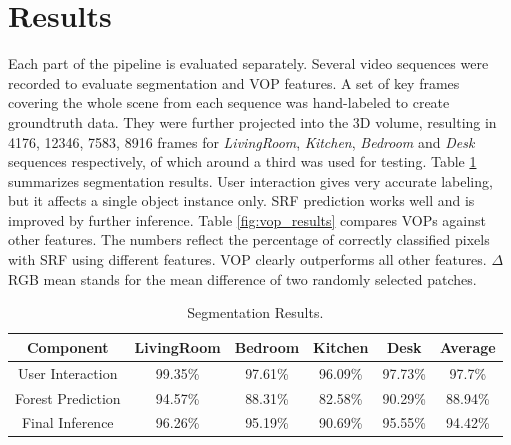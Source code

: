 \documentclass{llncs}
\begin{document}
% 

\section{Results}
  Each part of the pipeline is evaluated separately. Several video sequences were recorded to evaluate segmentation and VOP features. A set of key frames covering the whole scene from each sequence was hand-labeled to create groundtruth data. They were further projected into the 3D volume, resulting in 4176, 12346, 7583, 8916 frames for \emph{LivingRoom}, \emph{Kitchen}, \emph{Bedroom} and \emph{Desk} sequences respectively, of which around a third was used for testing. Table \ref{fig:segm_results} summarizes segmentation results. User interaction gives very accurate labeling, but it affects a single object instance only. SRF prediction works well and is improved by further inference. Table \ref{fig:vop_results} compares VOPs against other features. The numbers reflect the percentage of correctly classified pixels with SRF using different features. VOP clearly outperforms all other features. $\Delta$ RGB mean stands for the mean difference of two randomly selected patches. 
  
  
\begin{table}[!ht]	
 \center
 \caption{Segmentation Results.}
 \begin{tabular}{c|c|c|c|c|c}
  \textbf{Component} & \textbf{LivingRoom} & \textbf{Bedroom} & \textbf{Kitchen} & \textbf{Desk} & \textbf{Average} \\ \hline
  User Interaction & 99.35\% & 97.61\% & 96.09\% & 97.73\% & 97.7\% \\ 
  Forest Prediction & 94.57\% & 88.31\% & 82.58\% & 90.29\% & 88.94\% \\
  Final Inference & 96.26\% & 95.19\% & 90.69\% & 95.55\% & 94.42\%
 \end{tabular}
 \label{fig:segm_results}
\end{table}
\end{document}
